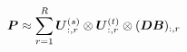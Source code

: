 \documentclass[border=6pt]{standalone}
\def\ten   #1{\mbox{\boldmath $#1$}{}}
\begin{document}
$\displaystyle
\ten{P} \approx \sum_{r=1}^R \ten{U}_{:,r}^{(s)} \otimes \ten{U}_{:,r}^{(t)} \otimes (\ten{D} \ten{B})_{:,r}
$
\end{document}

